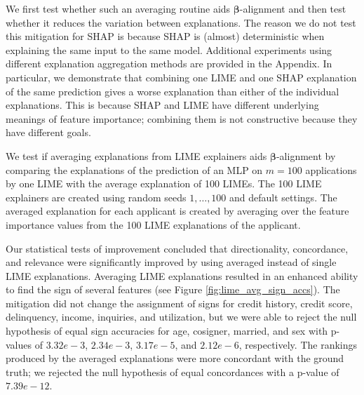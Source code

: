 \documentclass[mnsc,blindrev]{informs3}
\begin{document}
            
            We first test whether such an averaging routine aids $\boldsymbol{\beta}$-alignment and then test whether it reduces the variation between explanations. The reason we do not test this mitigation for SHAP is because SHAP is (almost) deterministic when explaining the same input to the same model. Additional experiments using different explanation aggregation methods are provided in the Appendix. In particular, we demonstrate that combining one LIME and one SHAP explanation of the same prediction gives a worse explanation than either of the individual explanations. This is because SHAP and LIME have different underlying meanings of feature importance; combining them is not constructive because they have different goals. 
        
            We test if averaging explanations from LIME explainers aids $\boldsymbol{\beta}$-alignment by comparing the explanations of the prediction of an MLP on $m=100$ applications by one LIME with the average explanation of 100 LIMEs. The 100 LIME explainers are created using random seeds $1,\ldots,100$ and default settings. The averaged explanation for each applicant is created by averaging over the feature importance values from the 100 LIME explanations of the applicant.  %

    
        
            Our statistical tests of improvement concluded that directionality, concordance, and relevance were significantly improved by using averaged instead of single LIME explanations. Averaging LIME explanations resulted in an enhanced ability to find the sign of several features (see Figure \ref{fig:lime_avg_sign_accs}). The mitigation did not change the assignment of signs for credit history, credit score, delinquency, income, inquiries, and utilization, but we were able to reject the null hypothesis of equal sign accuracies for age, cosigner, married, and sex with p-values of $3.32e-3$, $2.34e-3$, $3.17e-5$, and $2.12e-6$, respectively. The rankings produced by the averaged explanations were more concordant with the ground truth; we rejected the null hypothesis of equal concordances with a p-value of $7.39e-12$. %
\end{document}
